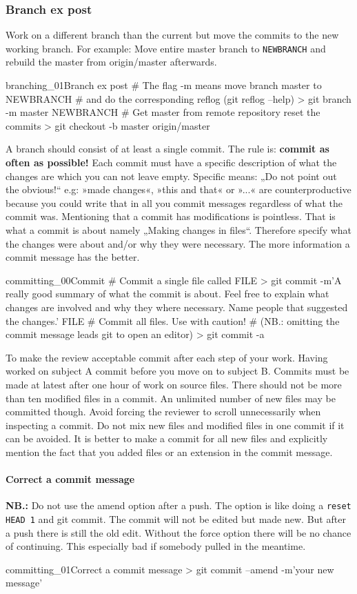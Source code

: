 \subsubsection{Branch ex post}
Work on a different branch than the current but move the commits to the new working branch. For example: Move entire master branch to \texttt{NEWBRANCH} and rebuild the master from origin/master afterwards. 
\begin{codelisting}{branching_01}{Branch ex post}
# The flag -m means move branch master to NEWBRANCH
# and do the corresponding reflog (git reflog --help)
> git branch -m master NEWBRANCH
# Get master from remote repository reset the commits
> git checkout -b master origin/master
\end{codelisting}
A branch should consist of at least a single commit. The rule is: \textbf{commit as often as possible!} Each commit must have a specific description of what the changes are which you can not leave empty. Specific means: „Do not point out the obvious!“ e.g: »made changes«, »this and that« or »...« are counterproductive because you could write that in all you commit messages regardless of what the commit was. Mentioning that a commit has modifications is pointless. That is what a commit is about namely „Making changes in files“. Therefore specify what the changes were about and/or why they were necessary.  The more information a commit message has the better.
\begin{codelisting}{committing_00}{Commit}
# Commit a single file called FILE
> git commit -m'A really good summary of what the commit is about. Feel free to explain what changes are involved and why they where necessary. Name people that suggested the changes.' FILE
# Commit all files. Use with caution!
# (NB.: omitting the commit message leads git to open an editor)
> git commit -a
\end{codelisting}
To make the review acceptable commit after each step of your work. Having worked on subject A commit before you move on to subject B. Commits must be made at latest after one hour of work on source files. There should not be more than ten modified files in a commit. An unlimited number of new files may be committed though. Avoid forcing the reviewer to scroll unnecessarily when inspecting a commit. Do not mix new files and modified files in one commit if it can be avoided. It is better to make a commit for all new files and explicitly mention the fact that you added files or an extension in the commit message.
\paragraph{Correct a commit message}
\textbf{NB.:} Do not use the amend option after a push. The option is like doing a \texttt{reset HEAD~1} and git commit. The commit will not be edited but made new. But after a push there is still the old edit. Without the force option there will be no chance of continuing. This especially bad if somebody pulled in the meantime.
\begin{codelisting}{committing_01}{Correct a commit message}
> git commit --amend -m'your new message'
\end{codelisting}
\nopagebreak[4]